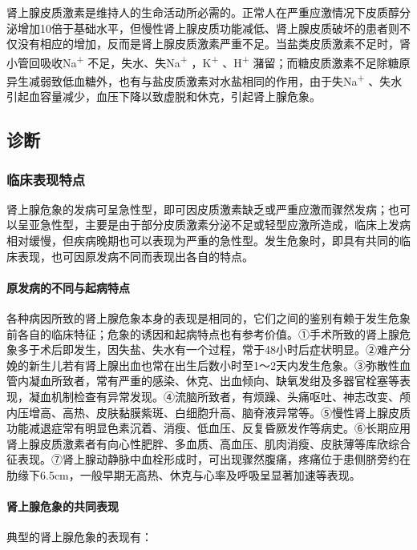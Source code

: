 肾上腺皮质激素是维持人的生命活动所必需的。正常人在严重应激情况下皮质醇分泌增加10倍于基础水平，但慢性肾上腺皮质功能减低、肾上腺皮质破坏的患者则不仅没有相应的增加，反而是肾上腺皮质激素严重不足。当盐类皮质激素不足时，肾小管回吸收Na\textsuperscript{+}
不足，失水、失Na\textsuperscript{+} ，K\textsuperscript{+}
、H\textsuperscript{+}
潴留；而糖皮质激素不足除糖原异生减弱致低血糖外，也有与盐皮质激素对水盐相同的作用，由于失Na\textsuperscript{+}
、失水引起血容量减少，血压下降以致虚脱和休克，引起肾上腺危象。

\subsection{诊断}

\subsubsection{临床表现特点}

肾上腺危象的发病可呈急性型，即可因皮质激素缺乏或严重应激而骤然发病；也可以呈亚急性型，主要是由于部分皮质激素分泌不足或轻型应激所造成，临床上发病相对缓慢，但疾病晚期也可以表现为严重的急性型。发生危象时，即具有共同的临床表现，也可因原发病不同而表现出各自的特点。

\paragraph{原发病的不同与起病特点}

各种病因所致的肾上腺危象本身的表现是相同的，它们之间的鉴别有赖于发生危象前各自的临床特征；危象的诱因和起病特点也有参考价值。①手术所致的肾上腺危象多于术后即发生，因失盐、失水有一个过程，常于48小时后症状明显。②难产分娩的新生儿若有肾上腺出血也常在出生后数小时至1～2天内发生危象。③弥散性血管内凝血所致者，常有严重的感染、休克、出血倾向、缺氧发绀及多器官栓塞等表现，凝血机制检查有异常发现。④流脑所致者，有烦躁、头痛呕吐、神志改变、颅内压增高、高热、皮肤黏膜紫斑、白细胞升高、脑脊液异常等。⑤慢性肾上腺皮质功能减退症常有明显色素沉着、消瘦、低血压、反复昏厥发作等病史。⑥长期应用肾上腺皮质激素者有向心性肥胖、多血质、高血压、肌肉消瘦、皮肤薄等库欣综合征表现。⑦肾上腺动静脉中血栓形成时，可出现骤然腹痛，疼痛位于患侧脐旁约在肋缘下6.5cm，一般早期无高热、休克与心率及呼吸呈显著加速等表现。

\paragraph{肾上腺危象的共同表现}

典型的肾上腺危象的表现有：


